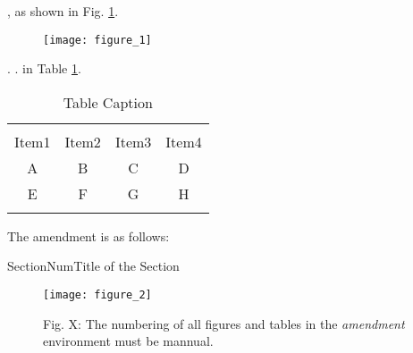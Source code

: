
\reviewer{}

\begin{question}
\lipsum[1][1-5]
\end{question}

\response
\lipsum[1][6]

\begin{question}
\lipsum[2][1-5]
\end{question}

\response
\lipsum[2][6-10]
\lipsum[2][11], as shown in Fig. \ref{fig_1}.
\begin{figure}[ht]
    \centering \texttt{[image: figure\_1]}
    \caption{\lipsum[2][12]}
    \label{fig_1}
\end{figure} 

\lipsum[3][1] \cite{doe2021Title1}.
\lipsum[3][2] \cite{doe2021Title2,bourne2021Title3}.
\lipsum[3][3] in Table \ref{table_1}. 

\begin{table}[!h]
	\caption{Table Caption}
	\label{table_1}
	\centering
	\begin{tabular}{c c c c}
		\hline\hline \\ [-3mm]
		Item1    & Item2     & Item3   & Item4 \\ 
		\hline
		A & B & C & D \\
		E & F & G & H \\
		\hline\hline \\ [-3mm]
    \end{tabular}
\end{table}

\lipsum[3][4-8]
The amendment is as follows:
\begin{amendment}{SectionNum}{Title of the Section}
\lipsum[4][1-10]

\begin{figure}[H]
    \centering
    \texttt{[image: figure\_2]}
	\caption*{Fig. X: The numbering of all figures and tables in the \textit{amendment} environment must be mannual.}
    \label{fig_ame_1}
\end{figure}
\end{amendment}




